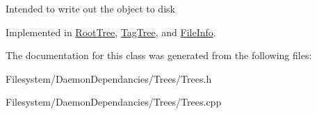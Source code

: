 Intended to write out the object to disk 

Implemented in \mbox{\hyperlink{classRootTree_ad6eefe5d46ee37b3725799897a78c2dd}{Root\+Tree}}, \mbox{\hyperlink{classTagTree_adf13e01b25991ecfef1ad958e02c07fe}{Tag\+Tree}}, and \mbox{\hyperlink{classFileInfo_a8e835f000ddfd0f1097ccfa7e7801a09}{File\+Info}}.



The documentation for this class was generated from the following files\+:\begin{DoxyCompactItemize}
\item 
Filesystem/\+Daemon\+Dependancies/\+Trees/Trees.\+h\item 
Filesystem/\+Daemon\+Dependancies/\+Trees/Trees.\+cpp\end{DoxyCompactItemize}
